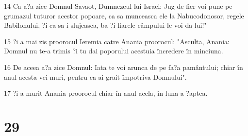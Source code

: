 \par 14 Ca a?a zice Domnul Savaot, Dumnezeul lui Israel: Jug de fier voi pune pe grumazul tuturor acestor popoare, ca sa munceasca ele la Nabucodonosor, regele Babilonului, ?i ca sa-i slujeasca, ba ?i fiarele câmpului le voi da lui!"
\par 15 ?i a mai zis proorocul Ieremia catre Anania proorocul: "Asculta, Anania: Domnul nu te-a trimis ?i tu dai poporului acestuia încredere în minciuna.
\par 16 De aceea a?a zice Domnul: Iata te voi arunca de pe fa?a pamântului; chiar în anul acesta vei muri, pentru ca ai grait împotriva Domnului".
\par 17 ?i a murit Anania proorocul chiar în anul acela, în luna a ?aptea.

\chapter{29}

